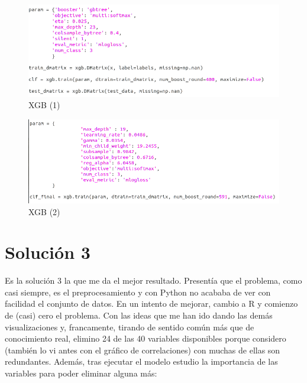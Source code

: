 \begin{figure}[H] %
	\centering
	\includegraphics[scale=0.5]{xgb2.png}  %
	\caption{XGB (1)} 
	\label{fig:xgb2}
\end{figure}

\begin{figure}[H] %
	\centering
	\includegraphics[scale=0.5]{xgb3.png}  %
	\caption{XGB (2)} 
	\label{fig:xgb3}
\end{figure}

\newpage

\section{Solución 3}

Es la solución 3 la que me da el mejor resultado. Presentía que el problema, como casi siempre, es el preprocesamiento y con Python no acababa de ver con facilidad el conjunto de datos. En un intento de mejorar, cambio a R y comienzo de (casi) cero el problema. Con las ideas que me han ido dando las demás visualizaciones y, francamente, tirando de sentido común más que de conocimiento real, elimino 24 de las 40 variables disponibles porque considero (también lo vi antes con el gráfico de correlaciones) con muchas de ellas son redundantes. Además, tras ejecutar el modelo estudio la importancia de las variables para poder eliminar alguna más:



